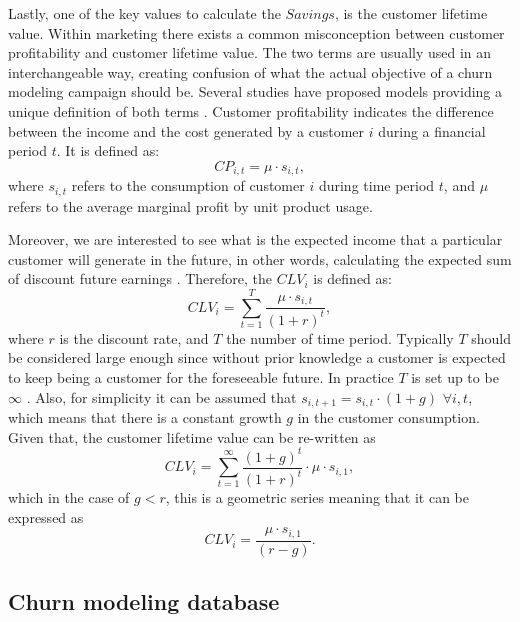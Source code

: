 Lastly, one of the key values to calculate the $Savings$, is the customer lifetime value. Within 
marketing there exists a common misconception between customer profitability and customer lifetime 
value. The two terms are usually used in an interchangeable way, 
creating confusion of what the actual objective of a churn modeling campaign should be. Several 
studies have proposed models providing a unique definition of both terms 
\citep{Neslin2006,Pfeifer2004,Milne1999a,VanRaaij2003}. Customer 
profitability indicates the difference between the income and the cost 
generated by a customer $i$ during a financial period $t$. It is defined as: 
\begin{equation}
	CP_{i,t} = \mu  \cdot s_{i,t},
\end{equation}
where  $s_{i,t}$ refers to the consumption of customer $i$ during time period $t$, and $\mu$ refers 
to the average marginal profit by unit product usage.  

Moreover, we are interested to see what is the expected income that a particular customer will 
generate in the future, in other words, calculating the expected sum of 
discount future earnings \citep{Neslin2006}. Therefore, the $CLV_i$ is defined as:
\begin{equation}
	CLV_i = \sum_{t=1}^T\frac{\mu \cdot s_{i,t}}{(1+r)^t},
\end{equation}
where $r$ is the discount rate, and $T$ the number of time period.
Typically $T$ should be considered large enough since without prior 
knowledge a customer is expected to keep being a customer for the foreseeable future. In practice 
$T$ is set up to be $\infty$ \citep{Glady2009}. Also, for simplicity it can be assumed that 
$s_{i,t+1}=s_{i,t}\cdot (1+g)$ $\forall {i,t}$, which means that there is a constant growth $g$ in 
the customer consumption. Given that, the customer lifetime value can be re-written as
\begin{equation}
 CLV_i = \sum_{t=1}^\infty\frac{ (1+g)^t}{(1+r)^t}\cdot \mu\cdot s_{i,1},
\end{equation}
which in the case of $g<r$, this is a geometric series meaning that it can be expressed as
\begin{equation}
 CLV_i = \frac{\mu\cdot s_{i,1}}{(r-g)}.
\end{equation}


\subsection{Churn modeling database}
\label{sec:4:1:data}

